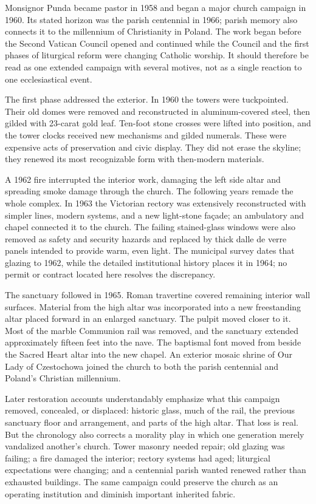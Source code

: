Monsignor Punda became pastor in 1958 and began a major church campaign in 1960. Its stated horizon was the parish centennial in 1966; parish memory also connects it to the millennium of Christianity in Poland. The work began before the Second Vatican Council opened and continued while the Council and the first phases of liturgical reform were changing Catholic worship. It should therefore be read as one extended campaign with several motives, not as a single reaction to one ecclesiastical event.

The first phase addressed the exterior. In 1960 the towers were tuckpointed. Their old domes were removed and reconstructed in aluminum-covered steel, then gilded with 23-carat gold leaf. Ten-foot stone crosses were lifted into position, and the tower clocks received new mechanisms and gilded numerals. These were expensive acts of preservation and civic display. They did not erase the skyline; they renewed its most recognizable form with then-modern materials.

A 1962 fire interrupted the interior work, damaging the left side altar and spreading smoke damage through the church. The following years remade the whole complex. In 1963 the Victorian rectory was extensively reconstructed with simpler lines, modern systems, and a new light-stone façade; an ambulatory and chapel connected it to the church. The failing stained-glass windows were also removed as safety and security hazards and replaced by thick dalle de verre panels intended to provide warm, even light. The municipal survey dates that glazing to 1962, while the detailed institutional history places it in 1964; no permit or contract located here resolves the discrepancy.

The sanctuary followed in 1965. Roman travertine covered remaining interior wall surfaces. Material from the high altar was incorporated into a new freestanding altar placed forward in an enlarged sanctuary. The pulpit moved closer to it. Most of the marble Communion rail was removed, and the sanctuary extended approximately fifteen feet into the nave. The baptismal font moved from beside the Sacred Heart altar into the new chapel. An exterior mosaic shrine of Our Lady of Czestochowa joined the church to both the parish centennial and Poland's Christian millennium.

Later restoration accounts understandably emphasize what this campaign removed, concealed, or displaced: historic glass, much of the rail, the previous sanctuary floor and arrangement, and parts of the high altar. That loss is real. But the chronology also corrects a morality play in which one generation merely vandalized another's church. Tower masonry needed repair; old glazing was failing; a fire damaged the interior; rectory systems had aged; liturgical expectations were changing; and a centennial parish wanted renewed rather than exhausted buildings. The same campaign could preserve the church as an operating institution and diminish important inherited fabric.

